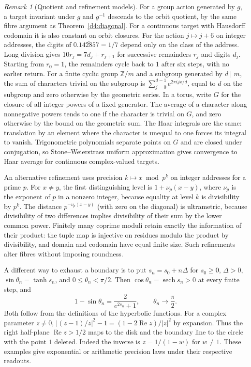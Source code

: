 \documentclass[11pt,reqno]{amsart}
\theoremstyle{definition}
\theoremstyle{remark}
\newtheorem{remark}[theorem]{Remark}
\numberwithin{equation}{section}
\begin{document}
\begin{remark}[Quotient and refinement models]\label{d4:quotients}
For a group action generated by \(g\), a target invariant under \(g\)
and \(g^{-1}\) descends to the orbit quotient, by the same fibre
argument as Theorem~\ref{d4:diagonal}. For a continuous target with
Hausdorff codomain it is also constant on orbit closures. For the
action \(j\mapsto j+6\) on integer addresses, the digits of
\(0.\overline{142857}=1/7\) depend only on the class of the address.
Long division gives \(10r_j=7d_j+r_{j+1}\) for successive remainders
\(r_j\) and digits \(d_j\). Starting from \(r_0=1\), the remainders
cycle back to \(1\) after six steps, with no earlier return.
For a finite cyclic group \(\mathbb Z/m\) and a subgroup generated by
\(d\mid m\), the sum of characters trivial on the subgroup is
\(\sum_{j=0}^{d-1}e^{2\pi i jx/d}\), equal to \(d\) on the subgroup
and zero otherwise by the geometric series. In a torus, write \(G\) for the closure of all integer powers of a
fixed generator. The average of a character along nonnegative powers
tends to one if the character is trivial on \(G\), and zero otherwise
by the bound on the geometric sum. The Haar integrals are the same:
translation by an element where the character is unequal to one
forces its integral to vanish. Trigonometric polynomials separate
points on \(G\) and are closed under conjugation, so Stone--Weierstrass
uniform approximation gives convergence to Haar average for continuous
complex-valued targets.

An alternative refinement uses precision \(k\mapsto x\bmod p^k\)
on integer addresses for a prime \(p\). For \(x\ne y\), the first
distinguishing level is \(1+\nu_p(x-y)\), where \(\nu_p\) is the
exponent of \(p\) in a nonzero integer, because equality at level
\(k\) is divisibility by \(p^k\). The distance \(p^{-\nu_p(x-y)}\)
(with zero on the diagonal) is ultrametric, because divisibility of
two differences implies divisibility of their sum by the lower
common power. Finitely many coprime moduli retain exactly the
information of their product: the tuple map is injective on
residues modulo the product by divisibility, and domain and
codomain have equal finite size. Such refinements alter fibres
without imposing roundness.

A different way to exhaust a boundary is to put
\(s_n=s_0+n\Delta\) for \(s_0\ge0\), \(\Delta>0\),
\(\sin\theta_n=\tanh s_n\), and \(0\le\theta_n<\pi/2\).
Then \(\cos\theta_n=\operatorname{sech}s_n>0\) at every finite
step, and
\[
 1-\sin\theta_n=\frac{2}{e^{2s_n}+1},\qquad
 \theta_n\longrightarrow\frac{\pi}{2}.
\]
Both follow from the definitions of the hyperbolic functions.
For a complex parameter \(z\ne0\),
\(\left|(z-1)/z\right|^2-1=(1-2\operatorname{Re}z)/|z|^2\)
by expansion. Thus the right half-plane
\(\operatorname{Re}z>1/2\) maps to the disk and the boundary
line to the circle with the point \(1\) deleted. Indeed
the inverse is \(z=1/(1-w)\) for \(w\ne1\).
These examples give exponential or arithmetic precision laws
under their respective readouts.
\end{remark}
\end{document}
